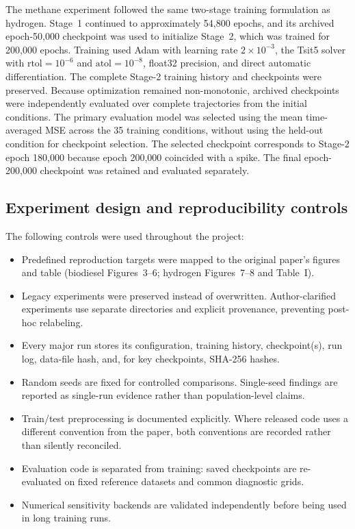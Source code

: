 \documentclass[11pt,a4paper]{article}
\begin{document}
The methane experiment followed the same two-stage
training formulation as hydrogen. 
Stage~1 continued to approximately
54,800 epochs, and its archived
epoch-50,000 checkpoint was used
to initialize Stage~2, which was
trained for 200,000 epochs. Training used Adam
with learning rate $2\times10^{-3}$, the Tsit5
solver with $\mathrm{rtol}=10^{-6}$ and
$\mathrm{atol}=10^{-8}$, float32 precision,
and direct automatic differentiation. The complete Stage-2 training history and
checkpoints were preserved. Because optimization
remained non-monotonic, archived checkpoints
were independently evaluated over complete
trajectories from the initial conditions.
The primary evaluation model was selected using
the mean time-averaged MSE across the 35 training
conditions, without using the held-out condition
for checkpoint selection. The selected checkpoint corresponds to Stage-2 epoch 180,000 because epoch 200,000 coincided with a spike. The final epoch-200,000
checkpoint was retained and evaluated separately.

\subsection{Experiment design and reproducibility controls}

The following controls were used throughout the project:
\begin{itemize}
    \item Predefined reproduction targets were mapped to the original paper's figures and table (biodiesel Figures~3--6; hydrogen Figures~7--8 and Table~I).
    \item Legacy experiments were preserved instead of overwritten. Author-clarified experiments use separate directories and explicit provenance, preventing post-hoc relabeling.
    \item Every major run stores its configuration, training history, checkpoint(s), run log, data-file hash, and, for key checkpoints, SHA-256 hashes.
    \item Random seeds are fixed for controlled comparisons. Single-seed findings are reported as single-run evidence rather than population-level claims.
    \item Train/test preprocessing is documented explicitly. Where released code uses a different convention from the paper, both conventions are recorded rather than silently reconciled.
    \item Evaluation code is separated from training: saved checkpoints are re-evaluated on fixed reference datasets and common diagnostic grids.
    \item Numerical sensitivity backends are validated independently before being used in long training runs.
\end{itemize}
\end{document}
